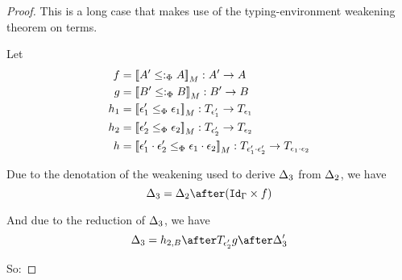 \documentclass{Report}
\begin{document}
\begin{proof}

    This is a long case that makes use of the typing-environment weakening theorem on terms.

    Let \begin{align}
        f & = \deno{A' \subtypep A}: A' \rightarrow A\\
        g & = \deno{B' \subtypep B}: B' \rightarrow B\\
        h_1 & = \deno{\e_1' \subeffectp \e_1} : \T{\e_1'}{} \rightarrow \T{\e_1}{} \\
        h_2 & = \deno{\e_2'\subeffectp \e_2}:\T{\e_2'}{} \rightarrow \T{\e_2}{}\\
        h & = \deno{\e_1'\dot\e_2'\subeffectp\e_1\dot\e_2}: \T{\e_1'\dot\e_2'}{}\rightarrow \T{\e_1\dot\e_2}{}
    \end{align}

    Due to the denotation of the weakening used to derive $\Delta_3$ from $\Delta_2$, we have 
    \begin{equation}
        \D_3 = \D_2\after(\idg\times f)
    \end{equation}

    And due to the reduction of $\Delta_3$,
    we have 
    \begin{equation}
        \D_3 = h_{2, B} \after \T{\e_2'}{g}\after \D_3'
    \end{equation}

    So:


\end{proof}
\end{document}
